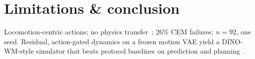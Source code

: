 \documentclass[10pt,twocolumn]{article}
\begin{document}
\section{Limitations \& conclusion}

Locomotion-centric actions; no physics transfer~\cite{hansen2024puppeteer,zhang2026worldinworld}; 26\% CEM failures; $n{=}92$, one seed.
Residual, action-gated dynamics on a frozen motion VAE yield a DINO-WM-style simulator that beats protocol baselines on prediction and planning~\cite{zhou2024dinowm,black2024pi0,lecun2022path,sutton2018rl}.



\end{document}
